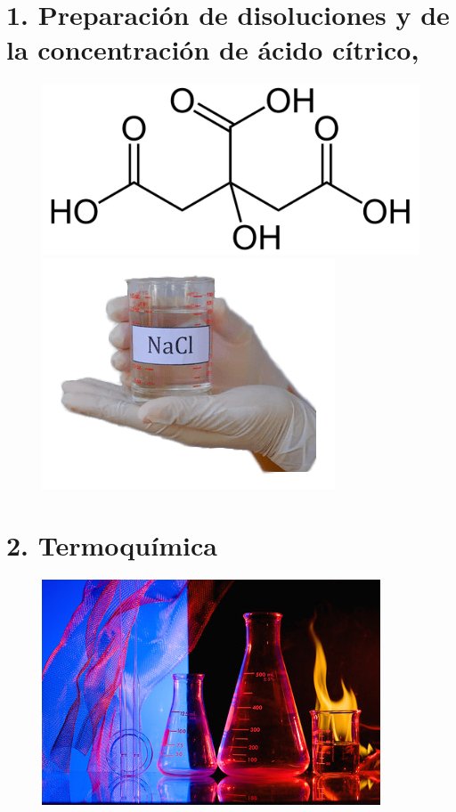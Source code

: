 \documentclass[12pt,letterpaper,oneside,openany,spanish]{book}
\begin{document}
    \chapter[Práctica 1]{1. Preparación de disoluciones y de la concentración de ácido cítrico, }
    \thispagestyle{empty}
    \vspace{1cm}
    \begin{figure}[h]
        \centering
        \hspace*{-0.2cm}
        \includegraphics[width=.48\textwidth]{fotos/citrico.png}\hfill
        \includegraphics[width=.48\textwidth]{fotos/disolucion.png}
        \hspace*{-0.4cm}
    \end{figure}


\chapter[Práctica 2]{2. Termoquímica}
\thispagestyle{empty}
\vspace{1cm}
\begin{figure}[h]
    \centering
    \hspace*{-0.2cm}
    \includegraphics[width=.8\textwidth]{fotos/portada.jpg}
    \hspace*{-0.4cm}
    \end{figure}

\end{document}
